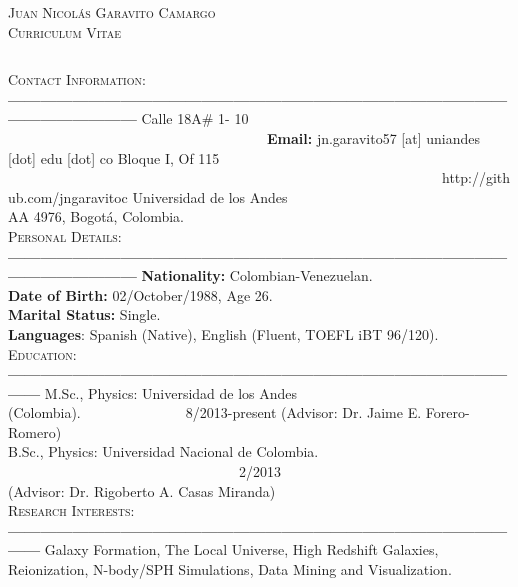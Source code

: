 \documentclass[letterpaper]{article}
\begin{document}
\begin{center}
\textsc{\LARGE Juan Nicol\'as Garavito Camargo}\\
\textsc{\large Curriculum Vitae}\\
\end{center}

$    $


\textsc{\Large Contact Information:}\\
{\bf---------------------------------------------------------------------------------------------------------------------}
Calle 18A\# 1- 10 \indent \ \ \ \ \ \ \ \ \ \ \ \ \ \ \ \ \ \ \ \ \ \ \ \ \ \ \ \ \ \ \ \ \ \  \ \  \ {\bf Email:} jn.garavito57 [at] uniandes [dot] edu [dot] co
Bloque I, Of 115 \indent \ \ \ \ \ \ \ \ \ \ \ \ \ \ \ \ \ \ \ \ \ \ \ \ \ \ \ \ \ \ \ \ \ \ \ \ \ \ \ \ \ \ \ \ \ \ \ \ \ \ \ \ \ \ \ \ \ \ \ \ \ \    http://github.com/jngaravitoc
Universidad de los Andes\\
AA 4976, Bogot\'a, Colombia.\\

\indent \textsc{\Large Personal Details:}\\
{\bf---------------------------------------------------------------------------------------------------------------------}
{\bf \large Nationality:} \large Colombian-Venezuelan.\\
{\bf Date of Birth:} 02/October/1988, Age 26.\\
{\bf Marital Status:} Single.\\
{\bf Languages}: Spanish (Native), English (Fluent, TOEFL iBT 96/120).\\

\textsc{\Large Education:}\\
{\bf---------------------------------------------------------------------------------------------------}
M.Sc., Physics: Universidad de los Andes (Colombia).\indent \ \ \ \ \ \ \ \ \ \ \ \ \ \ \  8/2013-present
(Advisor: Dr. Jaime E. Forero-Romero)\\
B.Sc., Physics: Universidad Nacional de Colombia. \indent \ \ \ \ \ \ \ \ \ \ \ \ \ \ \ \ \ \ \ \ \ \ \ \ \ \ \ \ \ \ \ \ \ 2/2013\\
(Advisor: Dr. Rigoberto A. Casas Miranda)\\

\textsc{\Large Research Interests:}\\
{\bf---------------------------------------------------------------------------------------------------}
Galaxy Formation, The Local Universe, High Redshift Galaxies, Reionization,  N-body/SPH Simulations, Data Mining
and Visualization.\\
\end{document}
